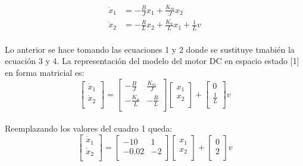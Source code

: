 \documentclass[journal]{IEEEtran}
\begin{document}
\begin{align}
\dot{x}_1&=-\frac{B}{J}x_1+\frac{K_m}{J}x_2 \\
\dot{x}_2&=-\frac{R}{L}x_2+\frac{K_a}{L}x_1+\frac{1}{L}v
\end{align}
\\
Lo anterior se hace tomando las ecuaciones 1 y 2 donde se  sustituye tmabién la ecuación 3 y 4. 
La representación del modelo del motor DC en espacio estado [1] en forma matricial es:
\[
\begin{bmatrix}
    \dot{x}_1 \\
    \dot{x}_2 \\
\end{bmatrix}
=
\begin{bmatrix}
    -\frac{B}{J} & \frac{K_m}{J} \\
    -\frac{K_a}{L} & -\frac{R}{L} \\
\end{bmatrix}
\begin{bmatrix}
    x_1 \\
    x_2 \\
\end{bmatrix}
+
\begin{bmatrix}
    0 \\
    \frac{1}{L} \\
\end{bmatrix} v
\]
\\
Reemplazando los valores del cuadro 1 queda:
\[
\begin{bmatrix}
    \dot{x}_1 \\
    \dot{x}_2 \\
\end{bmatrix}
=
\begin{bmatrix}
    -10 & 1 \\
    -0.02 & -2 \\
\end{bmatrix}
\begin{bmatrix}
    x_1 \\
    x_2 \\
\end{bmatrix}
+
\begin{bmatrix}
    0 \\
    2 \\
\end{bmatrix} v
\]
\end{document}
